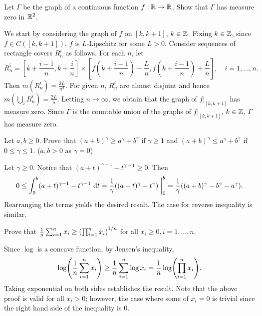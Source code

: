 \begin{exercise}
    Let $\Gamma$ be the graph of a continuous function 
    $f:\mathbb{R}\to\mathbb{R}$. Show that $\Gamma$ has measure zero in $\mathbb{R}^2$.
\end{exercise}
\begin{pf}
    We start by considering the graph of $f$ on $[k,k+1]$, 
    $k\in\mathbb{Z}$. Fixing $k\in\mathbb{Z}$, since $f\in C([k,k+1])$, $f$ is 
    $L$-Lipschitz for some $L>0$. Consider sequences of
    rectangle covers $R_n^i$ as follows. For each $n$, let 
    \[
        R_n^i = [k+\frac{i-1}{n}, k+\frac{i}{n}]
        \times[f(k+\frac{i-1}{n})-\frac{L}{n}, 
        f(k+\frac{i-1}{n})+\frac{L}{n}],
        \quad i = 1,\ldots,n.
    \]
    Then $m(R_n^i) = \frac{2L}{n^2}$. For given $n$, 
    $R_n^i$ are almost disjoint and hence $m(\bigcup_i R_n^i)
    = \frac{2L}{n}$. Letting $n\to\infty$, we obtain that 
    the graph of $f|_{[k,k+1]}$ has measure zero. Since 
    $\Gamma$ is the countable union of the graphs of 
    $f|_{[k,k+1]}$, $k\in\mathbb{Z}$, $\Gamma$ has measure zero.
\end{pf}

\begin{exercise}
    Let $a,b\geq 0$. Prove that $(a+b)^\gamma\geq 
    a^\gamma+b^\gamma$ if $\gamma\geq 1$ and $(a+b)^\gamma\leq 
    a^\gamma+b^\gamma$ if $0\leq\gamma\leq 1$. 
    ($a,b> 0$ as $\gamma=0$)
\end{exercise}
\begin{pf}
    Let $\gamma\geq 0$. Notice that $(a+t)^{\gamma-1}-
    t^{\gamma-1}\geq 0$. Then 
    \[
        0 \leq\int_{0}^{b}(a+t)^{\gamma-1}-t^{\gamma-1}\d{t} 
        = \frac{1}{\gamma}\pth{(a+t)^\gamma-t^\gamma}\at_0^b
        = \frac{1}{\gamma}((a+b)^\gamma-b^\gamma-a^\gamma).
    \]
    Rearranging the terms yields the desired result. The case 
    for reverse inequality is similar.
\end{pf}

\begin{exercise}[A-G inequality]
    Prove that $\frac{1}{n}\sum_{i=1}^{n}x_i\geq 
    \pth{\prod_{i=1}^{n}x_i}^{1/n}$ for all $x_i\geq 0, 
    i=1,\ldots,n$.
\end{exercise}
\begin{pf}
    Since $\log$ is a concave function, by Jensen's inequality, 
    \[
        \log\pth{\frac{1}{n}\sum_{i=1}^{n}x_i} 
        \geq \frac{1}{n}\sum_{i=1}^{n}\log x_i
        = \frac{1}{n}\log\pth{\prod_{i=1}^{n}x_i}.
    \]
    Taking exponential on both sides establishes the result. 
    Note that the above proof is valid for all $x_i>0$; 
    however, the case where some of $x_i=0$ is trivial 
    since the right hand side of the inequality is $0$.
\end{pf}